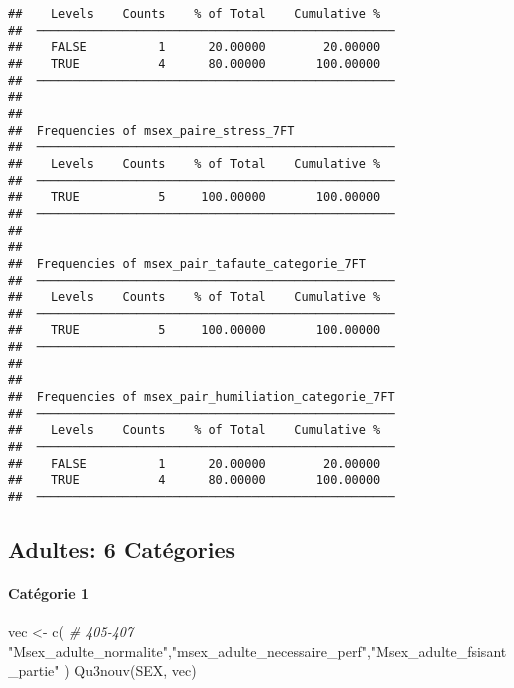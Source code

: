 \documentclass[
]{article}
\newenvironment{Shaded}{\begin{snugshade}}{\end{snugshade}}
\newcommand{\CommentTok}[1]{\textcolor[rgb]{0.56,0.35,0.01}{\textit{#1}}}
\newcommand{\FunctionTok}[1]{\textcolor[rgb]{0.00,0.00,0.00}{#1}}
\newcommand{\NormalTok}[1]{#1}
\newcommand{\OtherTok}[1]{\textcolor[rgb]{0.56,0.35,0.01}{#1}}
\newcommand{\StringTok}[1]{\textcolor[rgb]{0.31,0.60,0.02}{#1}}
\begin{document}
\begin{verbatim}
##    Levels    Counts    % of Total    Cumulative %   
##  ────────────────────────────────────────────────── 
##    FALSE          1      20.00000        20.00000   
##    TRUE           4      80.00000       100.00000   
##  ────────────────────────────────────────────────── 
## 
## 
##  Frequencies of msex_paire_stress_7FT               
##  ────────────────────────────────────────────────── 
##    Levels    Counts    % of Total    Cumulative %   
##  ────────────────────────────────────────────────── 
##    TRUE           5     100.00000       100.00000   
##  ────────────────────────────────────────────────── 
## 
## 
##  Frequencies of msex_pair_tafaute_categorie_7FT     
##  ────────────────────────────────────────────────── 
##    Levels    Counts    % of Total    Cumulative %   
##  ────────────────────────────────────────────────── 
##    TRUE           5     100.00000       100.00000   
##  ────────────────────────────────────────────────── 
## 
## 
##  Frequencies of msex_pair_humiliation_categorie_7FT 
##  ────────────────────────────────────────────────── 
##    Levels    Counts    % of Total    Cumulative %   
##  ────────────────────────────────────────────────── 
##    FALSE          1      20.00000        20.00000   
##    TRUE           4      80.00000       100.00000   
##  ──────────────────────────────────────────────────
\end{verbatim}

\hypertarget{adultes-6-catuxe9gories}{%
\subsection{Adultes: 6 Catégories}\label{adultes-6-catuxe9gories}}

\hypertarget{catuxe9gorie-1-3}{%
\paragraph{Catégorie 1}\label{catuxe9gorie-1-3}}

\begin{Shaded}
\begin{Highlighting}[]
\NormalTok{vec }\OtherTok{\textless{}{-}} \FunctionTok{c}\NormalTok{(  }\CommentTok{\# 405{-}407}
  \StringTok{"Msex\_adulte\_normalite"}\NormalTok{,}\StringTok{"msex\_adulte\_necessaire\_perf"}\NormalTok{,}\StringTok{"Msex\_adulte\_fsisant\_partie"}
\NormalTok{)}
\FunctionTok{Qu3nouv}\NormalTok{(SEX, vec)}
\end{Highlighting}
\end{Shaded}
\end{document}
